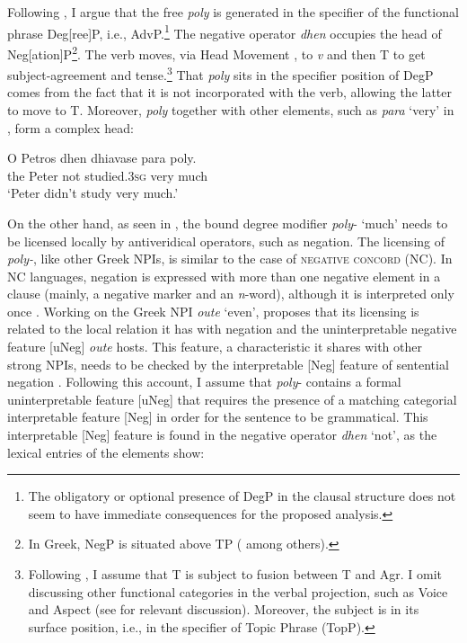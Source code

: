\documentclass[output=paper]{langscibook}
\begin{document}
Following \citet{cinque1999}, I argue that the free \textit{poly} is generated in the specifier of the functional phrase Deg[ree]P, i.e., AdvP.\footnote{The obligatory or optional presence of DegP in the clausal structure does not seem to have immediate consequences for the proposed analysis.} The negative operator \textit{dhen} occupies the head of Neg[ation]P\footnote{In Greek, NegP is situated above TP (\citealt{agouraki1991, tsoulas1993, rivero1994, phillippaki1994} among others).}. The verb moves, via Head Movement \citep{travis1984}, to \textit{v} and then T to get subject-agreement and tense.\footnote{Following \citet{spyroprev2009past}, I assume that T is subject to fusion between T and Agr. I omit discussing other functional categories in the verbal projection, such as Voice and Aspect (see \citealt{merchant2015howmuch} for relevant discussion). Moreover, the subject is in its surface position, i.e., in the specifier of Topic Phrase (TopP).} That \textit{poly} sits in the specifier position of DegP comes from the fact that it is not incorporated with the verb, allowing the latter to move to T. Moreover, \textit{poly} together with other elements, such as \textit{para} `very' in , form a complex head:

\begin{exe}
\ex\label{gia:ex26}
    \gll O Petros dhen dhiavase para poly. \\
    the Peter not studied.\textsc{3sg} very much \\
    \trans `Peter didn't study very much.'
\end{exe}

\noindent On the other hand, as seen in , the bound degree modifier \textit{poly}- ‘much’ needs to be licensed locally by antiveridical operators, such as negation. The licensing of \textit{poly-}, like other Greek NPIs, is similar to the case of \textsc{negative concord} (NC). In NC languages, negation is expressed with more than one negative element in a clause (mainly, a negative marker and an \textit{n}-word), although it is interpreted only once \citep{giannaki1997dissert,giannaki1998,giannaki2002licensing,hedde2004phd,giannakihedde2017}. Working on the Greek NPI \textit{oute} ‘even’, \citet{giannaki2007even} proposes that its licensing is related to the local relation it has with negation and the uninterpretable negative feature [uNeg] \textit{oute} hosts. This feature, a characteristic it shares with other strong NPIs, needs to be checked by the interpretable [Neg] feature of sentential negation \citep{giannaki1997dissert,giannaki2007even,hedde2004phd}. Following this account, I assume that \textit{poly}- contains a formal uninterpretable feature [uNeg] that requires the presence of a matching categorial interpretable feature [Neg] in order for the sentence to be grammatical. This interpretable [Neg] feature is found in the negative operator \textit{dhen} ‘not’, as the lexical entries of the elements show:
\end{document}
